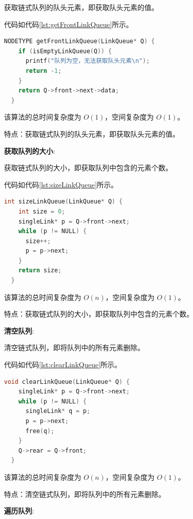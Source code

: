 \documentclass[lang=cn,newtx,10pt,scheme=chinese]{../elegantbook}
\begin{document}
获取链式队列的队头元素，即获取队头元素的值。

代码如代码\ref{lst:getFrontLinkQueue}所示。

\begin{lstlisting}[language=C++, caption={获取队头元素示例代码}, label={lst:getFrontLinkQueue}]
  NODETYPE getFrontLinkQueue(LinkQueue* Q) {
    if (isEmptyLinkQueue(Q)) {
      printf("队列为空，无法获取队头元素\n");
      return -1;
    }
    return Q->front->next->data;
  }

\end{lstlisting}

该算法的总时间复杂度为 $O(1)$，空间复杂度为 $O(1)$。

特点：获取链式队列的队头元素，即获取队头元素的值。

\textbf{获取队列的大小}:

获取链式队列的大小，即获取队列中包含的元素个数。

代码如代码\ref{lst:sizeLinkQueue}所示。

\begin{lstlisting}[language=C++, caption={获取队列的大小示例代码}, label={lst:sizeLinkQueue}]
  int sizeLinkQueue(LinkQueue* Q) {
    int size = 0;
    singleLink* p = Q->front->next;
    while (p != NULL) {
      size++;
      p = p->next;
    }
    return size;
  }

\end{lstlisting}

该算法的总时间复杂度为 $O(n)$，空间复杂度为 $O(1)$。

特点：获取链式队列的大小，即获取队列中包含的元素个数。

\textbf{清空队列}:

清空链式队列，即将队列中的所有元素删除。

代码如代码\ref{lst:clearLinkQueue}所示。

\begin{lstlisting}[language=C++, caption={清空队列示例代码}, label={lst:clearLinkQueue}]
  void clearLinkQueue(LinkQueue* Q) {
    singleLink* p = Q->front->next;
    while (p != NULL) {
      singleLink* q = p;
      p = p->next;
      free(q);
    }
    Q->rear = Q->front;
  }

\end{lstlisting}

该算法的总时间复杂度为 $O(n)$，空间复杂度为 $O(1)$。

特点：清空链式队列，即将队列中的所有元素删除。

\textbf{遍历队列}:
\end{document}
